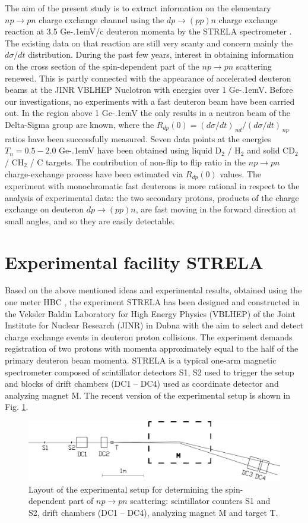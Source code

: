 \documentclass[twocolumn,epjc3]{svjour3}
\newcommand{\np}     {\ensuremath{np \rightarrow pn}\xspace}
\newcommand{\dpchex} {\ensuremath{dp \rightarrow (pp)n}\xspace}
\newcommand{\GeVc}   {Ge\kern-.1emV/c\xspace}
\newcommand{\GeV}    {Ge\kern-.1emV\xspace}
\begin{document}
The aim of the present study is to extract information on the elementary \np
charge exchange channel using the \dpchex charge exchange reaction at 3.5 \GeVc
deuteron momenta by the STRELA spectrometer \cite{gla13}. The existing data on
that reaction are still very scanty and concern mainly the $d\sigma/dt$
distribution. During the past few years, interest in obtaining information on
the cross section of the spin-dependent part of the \np scattering renewed. This
is partly connected with the appearance of accelerated deuteron beams at the
JINR VBLHEP Nuclotron with energies over 1 \GeV. Before our investigations, no
experiments with a fast deuteron beam have been carried out. In the region above
1 \GeV the only results in a neutron beam of the Delta-Sigma group
\cite{sha09,sha09_2,shi11} are known, where the
$R_{dp}(0) = (d\sigma/dt)_{\,nd} / (d\sigma/dt)_{\,np}$ ratios have been
successfully measured. Seven data points at the energies $T_n = 0.5 - 2.0$ \GeV
have been obtained using liquid D$_2$ / H$_2$ and solid CD$_2$ / CH$_2$ / C
targets. The contribution of non-flip to flip ratio in the \np charge-exchange
process have been estimated via $R_{dp}(0)$ values. The experiment with
monochromatic fast deuterons is more rational in respect to the analysis of
experimental data: the two secondary protons, products of the charge exchange on
deuteron \dpchex, are fast moving in the forward direction at small angles, and
so they are easily detectable.

\section{Experimental facility STRELA}
Based on the above mentioned ideas and experimental results, obtained using the
one meter HBC \cite{gla02,gla08}, the experiment STRELA has been designed and
constructed in the Veksler Baldin Laboratory for High Energy Physics (VBLHEP) of
the Joint Institute for Nuclear Research (JINR) in Dubna with the aim to select
and detect charge exchange events in deuteron proton collisions. The experiment
demands registration of two protons with momenta approximately equal to the half
of the primary deuteron beam momenta. STRELA is a typical one-arm magnetic
spectrometer composed of scintillator detectors S1, S2 used to trigger the setup
and blocks of drift chambers (DC1 -- DC4) used as coordinate detector and
analyzing magnet M. The recent version of the experimental setup is shown in
Fig. \ref{fig:STRELA_layout}.

\begin{figure}[t] %
  \centering
  \includegraphics[width=1.00\textwidth]{STRELA_layout.pdf}
  \caption{Layout of the experimental setup for determining the spin-dependent
    part of \np scattering: scintillator counters S1 and S2, drift chambers (DC1
    -- DC4), analyzing magnet M and target T.}
  \label{fig:STRELA_layout}
\end{figure}
\end{document}
